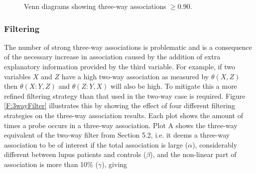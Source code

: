 \documentclass[a4paper, 12pt]{report}
\begin{document}
\begin{figure}
    \centering
    \qquad
    \caption{Venn diagrams showing three-way associations $\ge 0.90$.}
    \label{F:Venn3}
\end{figure}

\subsubsection{Filtering}
The number of strong three-way associations is problematic and is a consequence of the necessary increase in association caused by the addition of extra explanatory information provided by the third variable. For example, if two variables $X$ and $Z$ have a high two-way association as measured by $\theta(X, Z)$ then $\theta(X: Y,Z)$ and $\theta(Z: Y,X)$ will also be high. To mitigate this a more refined filtering strategy than that used in the two-way case is required. Figure \ref{F:3wayFilter} illustrates this by showing the effect of four different filtering strategies on the three-way association results. Each plot shows the amount of times a probe occurs in a three-way association. Plot A shows the three-way equivalent of the two-way filter from Section 5.2, i.e. it deems a three-way association to be of interest if the total association is large ($\alpha$), considerably different between lupus patients and controls ($\beta$), and the non-linear part of association is more than 10\% ($\gamma$), giving
\end{document}
